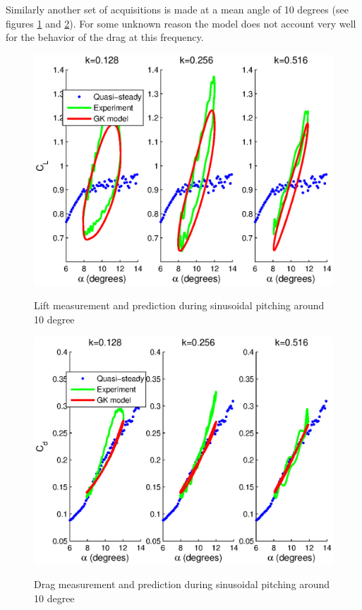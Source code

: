 \par Similarly another set of acquisitions is made at a mean angle of 10 degrees (see figures \ref{fig:Pitching_allcases_GK_Cl_10} and \ref{fig:Pitching_allcases_GK_Cd_10}).
For some unknown reason the model does not account very well for the behavior of the drag at this frequency.

\begin{figure}[h]
  \begin{center}
    \scalebox{1.0}  
    {\includegraphics{./Figures/Pitching_allcases_GK_CL_10_amp_2.eps}}
  \end{center}
  \caption{Lift measurement and prediction during sinusoidal pitching around 10 degree} 
  \label{fig:Pitching_allcases_GK_Cl_10}
\end{figure}

\begin{figure}[h]
  \begin{center}
    \scalebox{1.0}  
    {\includegraphics{./Figures/Pitching_allcases_GK_CD_10_amp_2.eps}}
  \end{center}
  \caption{Drag measurement and prediction during sinusoidal pitching around 10 degree} 
  \label{fig:Pitching_allcases_GK_Cd_10}
\end{figure}

